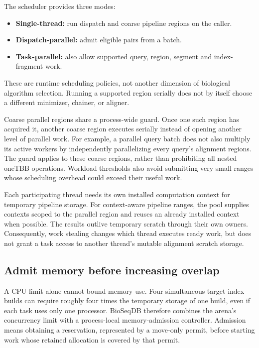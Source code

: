 The scheduler provides three modes:
\begin{itemize}
  \item \textbf{Single-thread:} run dispatch and coarse pipeline regions on the caller.
  \item \textbf{Dispatch-parallel:} admit eligible pairs from a batch.
  \item \textbf{Task-parallel:} also allow supported query, region, segment
    and index-fragment work.
\end{itemize}
These are runtime scheduling policies,
not another dimension of biological algorithm selection. Running a
supported region serially does not by itself choose a different minimizer,
chainer, or aligner.

Coarse parallel regions share a process-wide guard. Once one such region
has acquired it, another coarse region executes serially instead of opening
another level of parallel work. For example, a parallel query batch does not also
multiply its active workers by independently parallelizing every query's
alignment regions. The guard applies to these coarse regions, rather than
prohibiting all nested oneTBB operations. Workload thresholds also avoid
submitting very small ranges whose scheduling overhead could exceed their
useful work.

Each participating thread needs its own installed computation context for
temporary pipeline storage. For context-aware pipeline ranges, the pool
supplies contexts scoped to the parallel region and reuses an already
installed context when possible.
The results outlive temporary scratch through their own owners.
Consequently, work stealing changes which thread executes ready work, but
does not grant a task access to another thread's mutable alignment scratch
storage.

\subsection{Admit memory before increasing overlap}
\label{sec:arch-admission}

A CPU limit alone cannot bound memory use. Four simultaneous target-index
builds can require roughly four times the temporary storage of one build,
even if each task uses only one processor. BioSeqDB therefore combines the
arena's concurrency limit with a process-local memory-admission controller.
Admission means obtaining a reservation, represented by a move-only permit,
before starting work whose retained allocation is covered by that permit.

